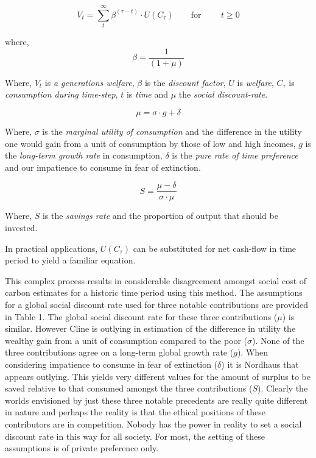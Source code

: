 \documentclass[11pt, oneside]{article}   	%
\begin{document}
\begin{equation}
V_t = \sum_t^\infty \beta^{(\tau - t)} \cdot U (C_\tau)
\qquad \text{for }
\qquad t \geq 0
\end{equation}

where,
\begin{equation}
\beta = \frac{1}{(1+\mu)}
\end{equation}

Where, $V_t$ is \emph{a generations welfare}, $\beta$ is the \emph{discount factor}, $U$ is \emph{welfare}, $C_\tau$ is \emph{consumption during time-step}, $t$ is \emph{time} and $\mu$ the \emph{social discount-rate}.

\begin{equation}
\mu = \sigma \cdot g + \delta
\end{equation}

Where, $\sigma$ is the \emph{marginal utility of consumption} and the difference in the utility one would gain from a unit of consumption by those of low and high incomes, $g$ is the \emph{long-term growth rate} in consumption, $\delta$ is the \emph{pure rate of time preference} and our impatience to consume in fear of extinction.

\begin{equation}
S = \frac{\mu-\delta}{\sigma \cdot \mu}
\end{equation}

Where, $S$ is the \emph{savings rate} and the proportion of output that should be invested.\par

In practical applications, $U (C_\tau)$ can be substituted for net cash-flow in time period to yield a familiar equation.\par

This complex process results in considerable disagreement amongst social cost of carbon estimates for a historic time period using this method.
The assumptions for a global social discount rate used for three notable contributions are provided in Table 1. The global social discount rate for these three contributions ($\mu$) is similar. However Cline is outlying in estimation of the difference in utility the wealthy gain from a unit of consumption compared to the poor ($\sigma$). None of the three contributions agree on a long-term global growth rate ($g$). When considering impatience to consume in fear of extinction ($\delta$) it is Nordhaus that appears outlying. This yields very different values for the amount of surplus to be saved relative to that consumed amongst the three contributions ($S$). Clearly the worlds envisioned by just these three notable precedents are really quite different in nature and perhaps the reality is that the ethical positions of these contributors are in competition. Nobody has the power in reality to set a social discount rate in this way for all society. For most, the setting of these assumptions is of private preference only.
\end{document}

